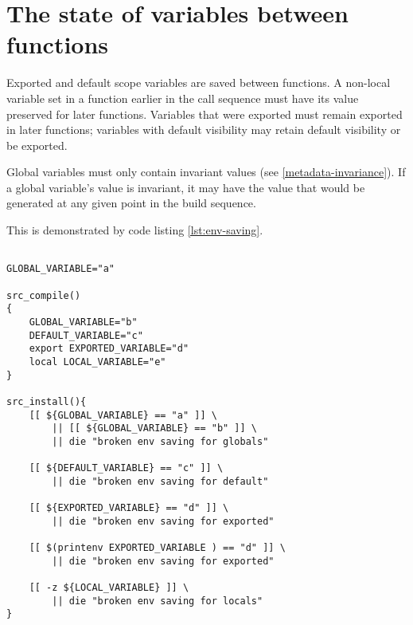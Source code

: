 \section{The state of variables between functions}
\label{ebuild-env-state}

Exported and default scope variables are saved between functions. A non-local variable set in a
function earlier in the call sequence must have its value preserved for later functions. Variables
that were exported must remain exported in later functions; variables with default visibility may
retain default visibility or be exported.

Global variables must only contain invariant values (see \ref{metadata-invariance}). If a global
variable's value is invariant, it may have the value that would be generated at any given point
in the build sequence.

This is demonstrated by code listing \ref{lst:env-saving}.

\begin{lstlisting}[float,caption=Environment state between functions,label=lst:env-saving]

GLOBAL_VARIABLE="a"

src_compile()
{
    GLOBAL_VARIABLE="b"
    DEFAULT_VARIABLE="c"
    export EXPORTED_VARIABLE="d"
    local LOCAL_VARIABLE="e"
}

src_install(){
    [[ ${GLOBAL_VARIABLE} == "a" ]] \
        || [[ ${GLOBAL_VARIABLE} == "b" ]] \
        || die "broken env saving for globals"

    [[ ${DEFAULT_VARIABLE} == "c" ]] \
        || die "broken env saving for default"

    [[ ${EXPORTED_VARIABLE} == "d" ]] \
        || die "broken env saving for exported"

    [[ $(printenv EXPORTED_VARIABLE ) == "d" ]] \
        || die "broken env saving for exported"

    [[ -z ${LOCAL_VARIABLE} ]] \
        || die "broken env saving for locals"
}
\end{lstlisting}

